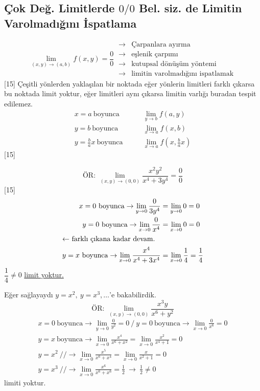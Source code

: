 \documentclass[11pt,a4paper]{article}
\begin{document}
\subsection{Çok Değ. Limitlerde $0/0$ Bel. siz. de Limitin Varolmadığını İspatlama}
\[ \lim_{(x,y)\to(a,b)}f(x,y)=\frac00\ \begin{array}{ll}\to&\text{Çarpanlara ayırma}\\ \to&\text{eşlenik çarpımı}\\ \to&\text{kutupsal dönüşüm yöntemi}\\ \to&\text{limitin varolmadığını ispatlamak}\end{array} \]
[15]
Çeşitli yönlerden yaklaşılan bir noktada eğer yönlerin limitleri farklı çıkarsa bu noktada limit yoktur, eğer limitleri aynı çıkarsa limitin varlığı buradan tespit edilemez.
\begin{align*}
x=a\ \text{boyunca}&\qquad\lim_{y\to b}f(a,y)\\
y=b\ \text{boyunca}&\qquad\lim_{x\to a}f(x,b)\\
y=\frac{b}{a}x\ \text{boyunca}&\qquad\lim_{x\to a}f\left(x,\frac{b}{a}x\right)
\end{align*}
[15]

\[ \text{ÖR: }\lim_{(x,y)\to(0,0)}\frac{x^2y^2}{x^4+3y^4}=\frac00 \]
[15]
\begin{align*}
x=0\ \text{boyunca}\to\lim_{y\to0}\frac{0}{3y^4}&=\lim_{y\to0}0=0\\
y=0\ \text{boyunca}\to\lim_{x\to0}\frac{0}{x^4}&=\lim_{x\to0}0=0\\
\intertext{\hfill $\leftarrow$ farklı çıkana kadar devam.}
y=x\ \text{boyunca}\to\lim_{x\to0}\frac{x^4}{x^4+3x^4}&=\lim_{x\to0}\frac14=\frac14
\end{align*}
$\dfrac14\neq0$ \quad \underline{limit yoktur.}

Eğer sağlayaydı $y=x^2,\ y=x^3,\ldots$'e bakabilirdik.
\[ \text{ÖR: }\lim_{(x,y)\to(0,0)}\frac{x^3y}{x^6+y^2} \]
\begin{gather*}
x=0\ \text{boyunca}\to\lim_{y\to0}\frac{0}{y^2}=0\ \Big/\ y=0\ \text{boyunca}\to\lim_{x\to0}\frac{0}{x^6}=0\\
y=x\ \text{boyunca}\to\lim_{x\to0}\frac{x^4}{x^6+x^2}=\lim_{x\to0}\frac{x^2}{x^4+1}=0\\
y=x^2\ \text{//}\to\lim_{x\to0}\frac{x^5}{x^6+x^4}=\lim_{x\to0}\frac{x}{x^2+1}=0\\
y=x^3\ \text{//}\to\lim_{x\to0}\frac{x^6}{x^6+x^6}=\frac12\ \to\ \frac12\neq0
\end{gather*}
limiti yoktur.
\end{document}
